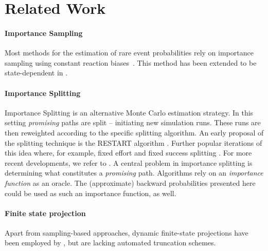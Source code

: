 \section{Related Work}
\paragraph{Importance Sampling}
Most methods for the estimation of rare event probabilities  rely on  importance sampling using constant reaction biases~\parencite{kuwahara2008efficient,daigle2011automated,chong2017path}.
This method has been extended to be state-dependent in \citet{roh2011state}.

\paragraph{Importance Splitting}
Importance Splitting is an alternative Monte Carlo estimation strategy.
In this setting \emph{promising} paths are split -- initiating new simulation runs.
These runs are then reweighted according to the specific splitting algorithm.
An early proposal of the splitting technique is the \ac{RESTART} algorithm \parencite{villen1994restart}.
Further popular iterations of this idea where, for example, fixed effort and fixed success splitting \parencite{garvels1998comparison}.
For more recent developments, we refer to \parencite{budde2017better,jegourel2013importance}.
A central problem in importance splitting is determining what constitutes a \emph{promising} path.
Algorithms rely on an \emph{importance function} as an oracle.
The (approximate) backward probabilities presented here could be used as such an importance function, as well.

\paragraph{Finite state projection}
Apart from sampling-based approaches, dynamic finite-state projections have been employed by \citet{mikeev2013numerical}, but are lacking automated truncation schemes.

